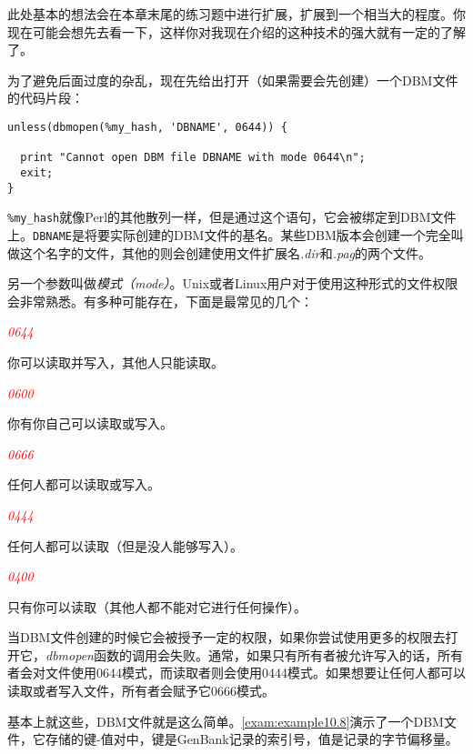 此处基本的想法会在本章末尾的练习题中进行扩展，扩展到一个相当大的程度。你现在可能会想先去看一下，这样你对我现在介绍的这种技术的强大就有一定的了解了。

为了避免后面过度的杂乱，现在先给出打开（如果需要会先创建）一个DBM文件的代码片段：

\begin{lstlisting}
unless(dbmopen(%my_hash, 'DBNAME', 0644)) {
  
  print "Cannot open DBM file DBNAME with mode 0644\n";
  exit;
}
\end{lstlisting}

\verb|%my_hash|就像Perl的其他散列一样，但是通过这个语句，它会被绑定到DBM文件上。\verb|DBNAME|是将要实际创建的DBM文件的基名。某些DBM版本会创建一个完全叫做这个名字的文件，其他的则会创建使用文件扩展名\textit{.dir}和\textit{.pag}的两个文件。

另一个参数叫做\textit{模式（mode）}。Unix或者Linux用户对于使用这种形式的文件权限会非常熟悉。有多种可能存在，下面是最常见的几个：

\textcolor{red}{\textit{0644}}
\begin{adjustwidth}{4em}{}
你可以读取并写入，其他人只能读取。
\end{adjustwidth}

\textcolor{red}{\textit{0600}}
\begin{adjustwidth}{4em}{}
你有你自己可以读取或写入。
\end{adjustwidth}

\textcolor{red}{\textit{0666}}
\begin{adjustwidth}{4em}{}
任何人都可以读取或写入。
\end{adjustwidth}

\textcolor{red}{\textit{0444}}
\begin{adjustwidth}{4em}{}
任何人都可以读取（但是没人能够写入）。
\end{adjustwidth}

\textcolor{red}{\textit{0400}}
\begin{adjustwidth}{4em}{}
只有你可以读取（其他人都不能对它进行任何操作）。
\end{adjustwidth}

当DBM文件创建的时候它会被授予一定的权限，如果你尝试使用更多的权限去打开它，\textit{dbmopen}函数的调用会失败。通常，如果只有所有者被允许写入的话，所有者会对文件使用0644模式，而读取者则会使用0444模式。如果想要让任何人都可以读取或者写入文件，所有者会赋予它0666模式。

基本上就这些，DBM文件就是这么简单。\autoref{exam:example10.8}演示了一个DBM文件，它存储的键-值对中，键是GenBank记录的索引号，值是记录的字节偏移量。

